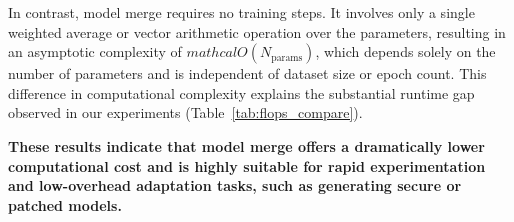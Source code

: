 \documentclass[conference,compsoc]{IEEEtran}
\begin{document}
In contrast, model merge requires no training steps. It involves only a single weighted average or vector arithmetic operation over the parameters, resulting in an asymptotic complexity of $mathcal{O}(N_{\text{params}})$, which depends solely on the number of parameters and is independent of dataset size or epoch count. This difference in computational complexity explains the substantial runtime gap observed in our experiments (Table~\ref{tab:flops_compare}).


\textbf{These results indicate that model merge offers a dramatically lower computational cost and is highly suitable for rapid experimentation and low-overhead adaptation tasks, such as generating secure or patched models.}






\end{document}
